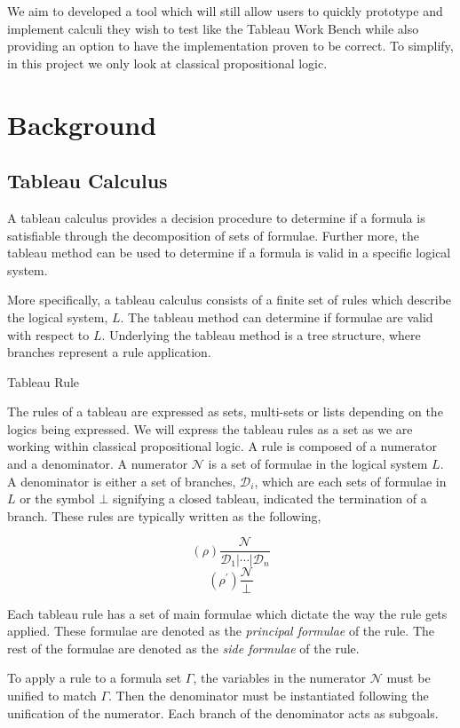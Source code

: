 We aim to developed a tool which will still allow users to quickly prototype
and implement calculi they wish to test like the Tableau Work Bench while also
providing an option to have the implementation proven to be correct.
To simplify, in this project we only look at classical propositional logic.

\section{Background}

\subsection{Tableau Calculus}

A tableau calculus provides a decision procedure to determine if a formula
is satisfiable through the decomposition of sets of formulae. Further more,
the tableau method can be used to determine if a formula is valid in a specific
logical system.

More specifically, a tableau calculus consists of a finite set of rules which
describe the logical system, $L$. The tableau method can determine if formulae
are valid with respect to $L$. Underlying the tableau method is a tree
structure, where branches represent a rule application.

\begin{definition}{Tableau Rule}

The rules of a tableau are expressed as sets, multi-sets or lists depending on
the logics being expressed. We will express the tableau rules as a set as we
are working within classical propositional logic. A rule is composed of a
numerator and a denominator. A numerator $\mathcal{N}$ is a set of formulae in
the logical system $L$. A denominator is either a set of branches,
$\mathcal{D}_i$, which are each sets of formulae in $L$ or the symbol $\bot$
signifying a closed tableau, indicated the termination of a branch. These rules
are typically written as the following,

\begin{multicols}{2}
\begin{equation*}
(\rho)\frac{\mathcal{N}}{\mathcal{D}_1 \vert \cdots \vert \mathcal{D}_n}
\end{equation*}
\break
\begin{equation*}
(\rho^{\prime})\frac{\mathcal{N}}{\bot}
\end{equation*}
\end{multicols}

Each tableau rule has a set of main formulae which dictate the way the rule
gets applied. These formulae are denoted as the \textit{principal formulae} of
the rule. The rest of the formulae are denoted as the \textit{side formulae} of
the rule.

To apply a rule to a formula set $\Gamma$, the variables in the numerator
$\mathcal{N}$ must be unified to match $\Gamma$.  Then the denominator must be
instantiated following the unification of the numerator. Each branch of the
denominator acts as subgoals.

\end{definition}


